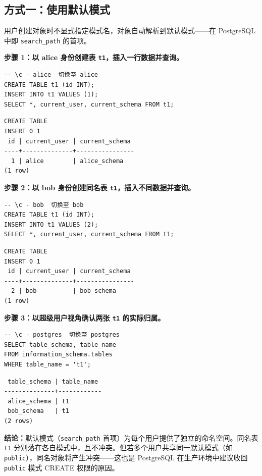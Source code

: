 \documentclass[12pt, a4paper]{academics}
\begin{document}
\subsection{方式一：使用默认模式}

用户创建对象时不显式指定模式名，对象自动解析到默认模式——在 PostgreSQL 中即 \texttt{search\_path} 的首项。

\textbf{步骤 1：以 alice 身份创建表 \texttt{t1}，插入一行数据并查询。}

\begin{verbatim}
-- \c - alice  切换至 alice
CREATE TABLE t1 (id INT);
INSERT INTO t1 VALUES (1);
SELECT *, current_user, current_schema FROM t1;
\end{verbatim}

\begin{verbatim}
CREATE TABLE
INSERT 0 1
 id | current_user | current_schema
----+--------------+----------------
  1 | alice        | alice_schema
(1 row)
\end{verbatim}

\textbf{步骤 2：以 bob 身份创建同名表 \texttt{t1}，插入不同数据并查询。}

\begin{verbatim}
-- \c - bob  切换至 bob
CREATE TABLE t1 (id INT);
INSERT INTO t1 VALUES (2);
SELECT *, current_user, current_schema FROM t1;
\end{verbatim}

\begin{verbatim}
CREATE TABLE
INSERT 0 1
 id | current_user | current_schema
----+--------------+----------------
  2 | bob          | bob_schema
(1 row)
\end{verbatim}

\textbf{步骤 3：以超级用户视角确认两张 \texttt{t1} 的实际归属。}

\begin{verbatim}
-- \c - postgres  切换至 postgres
SELECT table_schema, table_name
FROM information_schema.tables
WHERE table_name = 't1';
\end{verbatim}

\begin{verbatim}
 table_schema | table_name
--------------+------------
 alice_schema | t1
 bob_schema   | t1
(2 rows)
\end{verbatim}

\textbf{结论：}默认模式（\texttt{search\_path} 首项）为每个用户提供了独立的命名空间。同名表 \texttt{t1} 分别落在各自模式中，互不冲突。但若多个用户共享同一默认模式（如 \texttt{public}），同名对象将产生冲突——这也是 PostgreSQL 在生产环境中建议收回 \texttt{public} 模式 CREATE 权限的原因。
\end{document}
